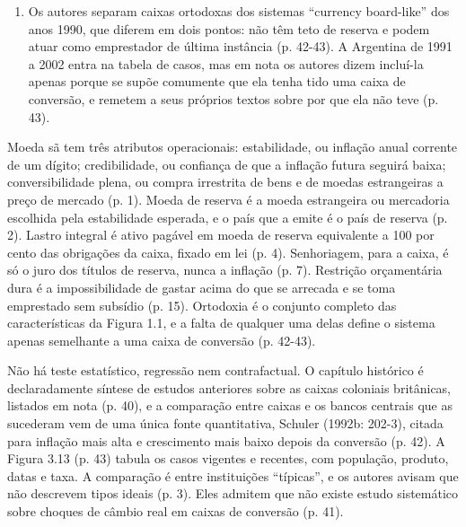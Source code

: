 \begin{enumerate}[leftmargin=*,nosep]
{boards}{p. 40}
O auge foi por volta de 1950, na África, no Caribe e no sul da Ásia. Todas
mantiveram taxa fixa e conversibilidade plena, inclusive durante a Grande
Depressão (p. 40-41). A conversão em bancos centrais, no fim dos anos 1950 e
nos anos 1960, é atribuída a política, não a desempenho.
\item Os autores separam caixas ortodoxas dos sistemas ``currency board-like''
dos anos 1990, que diferem em dois pontos: não têm teto de reserva e podem
atuar como emprestador de última instância (p. 42-43). A Argentina de 1991 a
2002 entra na tabela de casos, mas em nota os autores dizem incluí-la apenas
porque se supõe comumente que ela tenha tido uma caixa de conversão, e remetem
a seus próprios textos sobre por que ela não teve (p. 43).
\end{enumerate}

Moeda sã tem três atributos operacionais: estabilidade, ou inflação anual
corrente de um dígito; credibilidade, ou confiança de que a inflação futura
seguirá baixa; conversibilidade plena, ou compra irrestrita de bens e de
moedas estrangeiras a preço de mercado (p. 1). Moeda de reserva é a moeda
estrangeira ou mercadoria escolhida pela estabilidade esperada, e o país que a
emite é o país de reserva (p. 2). Lastro integral é ativo pagável em moeda de
reserva equivalente a 100 por cento das obrigações da caixa, fixado em lei
(p. 4). Senhoriagem, para a caixa, é só o juro dos títulos de reserva, nunca a
inflação (p. 7). Restrição orçamentária dura é a impossibilidade de gastar
acima do que se arrecada e se toma emprestado sem subsídio (p. 15). Ortodoxia é
o conjunto completo das características da Figura 1.1, e a falta de qualquer
uma delas define o sistema apenas semelhante a uma caixa de conversão
(p. 42-43).

Não há teste estatístico, regressão nem contrafactual. O capítulo histórico é
declaradamente síntese de estudos anteriores sobre as caixas coloniais
britânicas, listados em nota (p. 40), e a comparação entre caixas e os bancos
centrais que as sucederam vem de uma única fonte quantitativa, Schuler (1992b:
202-3), citada para inflação mais alta e crescimento mais baixo depois da
conversão (p. 42). A Figura 3.13 (p. 43) tabula os casos vigentes e recentes,
com população, produto, datas e taxa. A comparação é entre instituições
``típicas'', e os autores avisam que não descrevem tipos ideais (p. 3). Eles
admitem que não existe estudo sistemático sobre choques de câmbio real em
caixas de conversão (p. 41).

